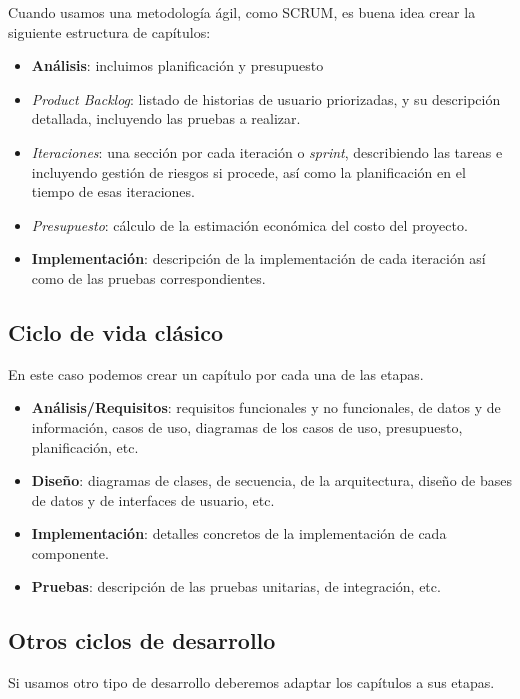 Cuando usamos una metodología ágil, como SCRUM, es buena idea crear la siguiente estructura de capítulos:
\begin{itemize}
    \item \textbf{Análisis}: incluimos planificación y presupuesto
    \item \textit{Product Backlog}: listado de historias de usuario priorizadas, y su descripción detallada, incluyendo las pruebas a realizar.
    \item \textit{Iteraciones}: una sección por cada iteración o \textit{sprint}, describiendo las tareas e incluyendo gestión de riesgos si procede, así como la planificación en el tiempo de esas iteraciones.
    \item \textit{Presupuesto}: cálculo de la estimación económica del costo del proyecto.
    \item \textbf{Implementación}: descripción de la implementación de cada iteración así como de las pruebas correspondientes. 
    
\end{itemize}
                

\subsection{Ciclo de vida clásico}
En este caso podemos crear un capítulo por cada una de las etapas.
                \begin{itemize}
                    \item \textbf{Análisis/Requisitos}: requisitos funcionales y no funcionales, de datos y de información, casos de uso, diagramas de los casos de uso, presupuesto, planificación, etc.
                    \item \textbf{Diseño}: diagramas de clases, de secuencia, de la arquitectura, diseño de bases de datos y de interfaces de usuario, etc.
                    \item \textbf{Implementación}: detalles concretos de la implementación de cada componente.
                    \item \textbf{Pruebas}: descripción de las pruebas unitarias, de integración, etc.
                \end{itemize}
\subsection{Otros ciclos de desarrollo}
Si usamos otro tipo de desarrollo deberemos adaptar los capítulos a sus etapas.

